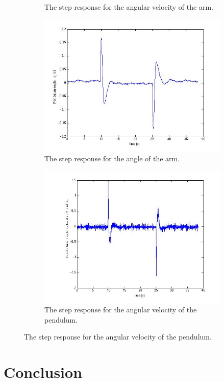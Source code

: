 \documentclass[10pt,a4paper]{article}
\begin{document}
\begin{figure}[H]
\begin{subfigure}[t]{0.49\textwidth}
			\centering
			\caption{The step response for the angular velocity of the arm.}
			\label{subfigure:srvisctheta}
		\end{subfigure}
		\begin{subfigure}[t]{0.49\textwidth}
			\includegraphics[scale=0.33]{plots/steprespvisctheta.jpg}
			\centering
			\caption{The step response for the angle of the arm.}			
			\label{subfigure:srvisctheta}
		\end{subfigure}
		\begin{subfigure}[t]{0.49\textwidth}
			\includegraphics[scale=0.33]{plots/steprespviscthetadot.jpg}
			\centering
			\caption{The step response for the angular velocity of the pendulum.}						
			\label{subfigure:srvisctheta}
		\end{subfigure}
\end{figure}


\section{Conclusion}
\end{document}

